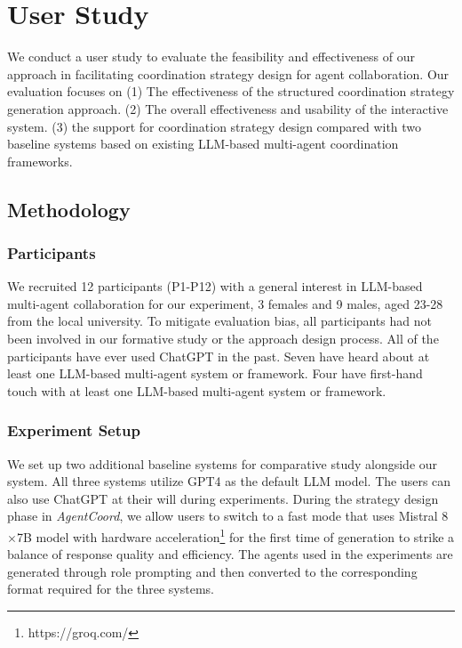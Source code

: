 \section{User Study}
We conduct a user study to evaluate the feasibility and effectiveness of our approach in facilitating coordination strategy design for agent collaboration. Our evaluation focuses on (1) The effectiveness of the structured coordination strategy generation approach. (2) The overall effectiveness and usability of the interactive system. (3) the support for coordination strategy design compared with two baseline systems based on existing LLM-based multi-agent coordination frameworks.

\subsection{Methodology}

\subsubsection{Participants}
We recruited 12 participants (P1-P12) with a general interest in LLM-based multi-agent collaboration for our experiment, 3 females and 9 males, aged 23-28 from the local university. To mitigate evaluation bias, all participants had not been involved in our formative study or the approach design process. All of the participants have ever used ChatGPT in the past. Seven have heard about at least one LLM-based multi-agent system or framework. Four have first-hand touch with at least one LLM-based multi-agent system or framework.

\subsubsection{Experiment Setup}
We set up two additional baseline systems for comparative study \cite{wong2023anchorage, feng2023promptmagician, feng2023xnli} alongside our system. All three systems utilize GPT4 as the default LLM model. The users can also use ChatGPT at their will during experiments. During the strategy design phase in \textit{AgentCoord}, we allow users to switch to a fast mode that uses Mistral 8$\times$7B model with hardware acceleration\footnote[5]{{https://groq.com/}} for the first time of generation to strike a balance of response quality and efficiency. The agents used in the experiments are generated through role prompting \cite{Expertprompting} and then converted to the corresponding format required for the three systems.


